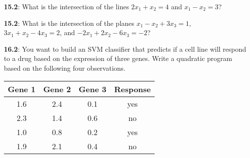 \documentclass[pal,wide,12pt]{pajarticle}
\newenvironment{problem}[1]{\noindent\textbf{#1}:}{\newpage}
\begin{document}
\begin{problem}{15.2}
What is the intersection of the lines $2x_1 + x_2 = 4$ and $x_1 - x_2 = 3$?
\end{problem}

\begin{problem}{15.2}
What is the intersection of the planes $x_1 - x_2 + 3x_3 = 1$, $3x_1 + x_2 - 4x_3 = 2$, and $-2x_1 + 2x_2 - 6x_3 = -2$?
\end{problem}

\begin{problem}{16.2}
You want to build an SVM classifier that predicts if a cell line will respond to a drug based on the expression of three genes. Write a quadratic program based on the following four observations.
\begin{center}
	\begin{tabular}{cccc}
		\toprule
		Gene 1 & Gene 2 & Gene 3 & Response \\
		\midrule
		1.6 & 2.4 & 0.1 & yes \\
		2.3 & 1.4 & 0.6 & no \\
		1.0 & 0.8 & 0.2 & yes \\
		1.9 & 2.1 & 0.4 & no \\
		\bottomrule
	\end{tabular}	
\end{center}

\end{problem}
\end{document}
